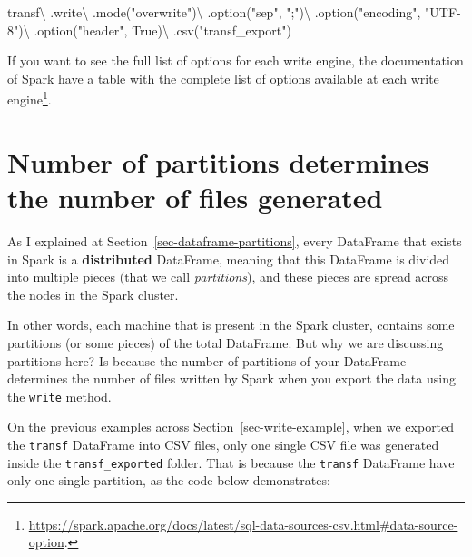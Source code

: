 \documentclass[
  11pt,
  letterpaper,
  DIV=11,
  numbers=noendperiod]{scrreprt}
\newenvironment{Shaded}{\begin{snugshade}}{\end{snugshade}}
\newcommand{\NormalTok}[1]{\textcolor[rgb]{0.00,0.23,0.31}{#1}}
\newcommand{\OperatorTok}[1]{\textcolor[rgb]{0.37,0.37,0.37}{#1}}
\newcommand{\StringTok}[1]{\textcolor[rgb]{0.13,0.47,0.30}{#1}}
\newcommand{\VariableTok}[1]{\textcolor[rgb]{0.07,0.07,0.07}{#1}}
\begin{document}
\begin{Shaded}
\begin{Highlighting}[]
\NormalTok{transf}\OperatorTok{\textbackslash{}}
\NormalTok{    .write}\OperatorTok{\textbackslash{}}
\NormalTok{    .mode(}\StringTok{"overwrite"}\NormalTok{)}\OperatorTok{\textbackslash{}}
\NormalTok{    .option(}\StringTok{"sep"}\NormalTok{, }\StringTok{";"}\NormalTok{)}\OperatorTok{\textbackslash{}}
\NormalTok{    .option(}\StringTok{"encoding"}\NormalTok{, }\StringTok{"UTF{-}8"}\NormalTok{)}\OperatorTok{\textbackslash{}}
\NormalTok{    .option(}\StringTok{"header"}\NormalTok{, }\VariableTok{True}\NormalTok{)}\OperatorTok{\textbackslash{}}
\NormalTok{    .csv(}\StringTok{"transf\_export"}\NormalTok{)}
\end{Highlighting}
\end{Shaded}

If you want to see the full list of options for each write engine, the
documentation of Spark have a table with the complete list of options
available at each write engine\footnote{\url{https://spark.apache.org/docs/latest/sql-data-sources-csv.html\#data-source-option}.}.

\hypertarget{sec-export-partition-coalesce}{%
\section{Number of partitions determines the number of files
generated}\label{sec-export-partition-coalesce}}

As I explained at Section~\ref{sec-dataframe-partitions}, every
DataFrame that exists in Spark is a \textbf{distributed} DataFrame,
meaning that this DataFrame is divided into multiple pieces (that we
call \emph{partitions}), and these pieces are spread across the nodes in
the Spark cluster.

In other words, each machine that is present in the Spark cluster,
contains some partitions (or some pieces) of the total DataFrame. But
why we are discussing partitions here? Is because the number of
partitions of your DataFrame determines the number of files written by
Spark when you export the data using the \texttt{write} method.

On the previous examples across Section~\ref{sec-write-example}, when we
exported the \texttt{transf} DataFrame into CSV files, only one single
CSV file was generated inside the \texttt{transf\_exported} folder. That
is because the \texttt{transf} DataFrame have only one single partition,
as the code below demonstrates:
\end{document}
